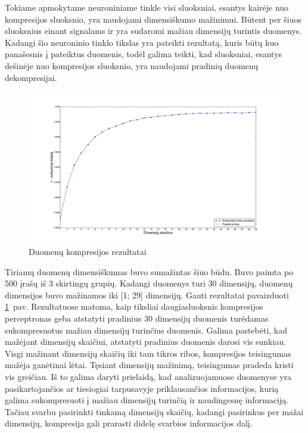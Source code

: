 \documentclass{VUMIFPSbakalaurinis}
\begin{document}
Tokiame apmokytame neuroniniame tinkle visi sluoksniai, esantys kairėje nuo kompresijos sluoksnio, yra naudojami dimensiškumo mažinimui.
Būtent per šiuos sluoksnius einant signalams ir yra sudaromi mažiau dimensijų turintis duomenys.
Kadangi šio neuroninio tinklo tikslas yra pateikti rezultatą, kuris būtų kuo panašesnis į pateiktus duomenis, todėl galima teikti, kad sluoksniai, esantys dešinėje nuo kompresijos sluoksnio, yra naudojami pradinių duomenų dekompresijai.

\begin{figure}
	\includegraphics[scale=0.25]{pics/compression_dimensions}
	\caption{Duomenų kompresijos rezultatai}
	\label{fig:compression_dimensions}
\end{figure}

Tiriamų duomenų dimensiškumas buvo sumažintas šiuo būdu.
Buvo paimta po 500 įrašų iš 3 skirtingų grupių.
Kadangi duomenys turi 30 dimensijų, duomenų dimensijos buvo mažinamos iki [1; 29] dimensijų.
Gauti rezultatai pavaizduoti \ref{fig:compression_dimensions}~pav.
Rezultatuose matoma, kaip tiksliai daugiasluoksnis kompresijos perceptronas geba atstatyti pradinius 30 dimensijų duomenis turėdamas sukompresuotus mažiau dimensijų turinčius duomenis.
Galima pastebėti, kad mažėjant dimensijų skaičiui, atstatyti pradinius duomenis darosi vis sunkiau.
Visgi mažinant dimensijų skaičių iki tam tikros ribos, kompresijos teisingumas mažėja ganėtinai lėtai.
Tęsiant dimensijų mažinimą, teisingumas pradeda kristi vis greičiau.
Iš to galima daryti prielaidą, kad analizuojamuose duomenyse yra pasikartojančios ar tiesiogiai tarpusavyje priklausančios informacijos, kurią galima sukompresuoti į mažiau dimensijų turinčią ir naudingesnę informaciją.
Tačiau svarbu pasirinkti tinkamą dimensijų skaičių, kadangi pasirinkus per mažai dimensijų, kompresija gali prarasti didelę svarbios informacijos dalį.
\end{document}

